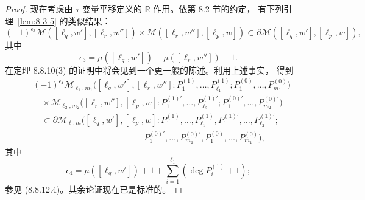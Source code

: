 \begin{proof}
现在考虑由 $\tau$-变量平移定义的 $\mathbb R$-作用。依第 8.2 节的约定，
有下列引理~\ref{lem:8-3-5} 的类似结果：
\[
 (-1)^{\epsilon_3}
 \mathcal M([\ell_q,w'],[\ell_r,w''])
 \times\mathcal M([\ell_r,w''],[\ell_p,w])
 \subset
 \partial\mathcal M([\ell_q,w'],[\ell_p,w]),
\]
其中
\[
 \epsilon_3=\mu([\ell_q,w'])-\mu([\ell_r,w''])-1.
\]
在定理 8.8.10(3) 的证明中将会见到一个更一般的陈述。利用上述事实，
得到
\[
\begin{aligned}
 &(-1)^{\epsilon_4}
 \mathcal M_{\ell_1,m_1}
 \bigl([\ell_q,w'],[\ell_r,w'']:
 P_1^{(1)},\ldots,P_{\ell_1}^{(1)};
 P_1^{(0)},\ldots,P_{m_1}^{(0)}\bigr)\\
 &\quad{}\times
 \mathcal M_{\ell_2,m_2}
 \bigl([\ell_r,w''],[\ell_p,w]:
 P_1^{(1)'},\ldots,P_{\ell_2}^{(1)'};
 P_1^{(0)'},\ldots,P_{m_2}^{(0)'}\bigr)\\
 &\quad\subset
 \partial\mathcal M_{\ell,m}
 \bigl([\ell_q,w'],[\ell_p,w]:
 P_1^{(1)},\ldots,P_{\ell_1}^{(1)},
 P_1^{(1)'},\ldots,P_{\ell_2}^{(1)'};\\[-2pt]
 &\hspace{13em}
 P_1^{(0)'},\ldots,P_{m_2}^{(0)'},
 P_1^{(0)},\ldots,P_{m_1}^{(0)}\bigr),
\end{aligned}
\]
其中
\[
 \epsilon_4=\mu([\ell_q,w'])+1
 +\sum_{i=1}^{\ell_1}(\deg P_i^{(1)}+1);
\]
参见 (8.8.12.4)。其余论证现在已是标准的。
\end{proof}
